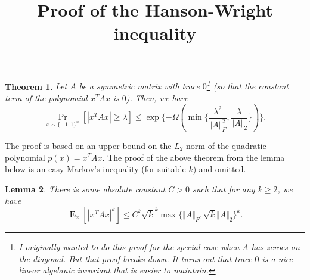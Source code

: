 \documentclass[11pt,a4paper]{article}
\title{Proof of the Hanson-Wright inequality}
\date{}
\newtheorem{theorem}{Theorem}
\newtheorem{lemma}[theorem]{Lemma}
\newcommand{\prob}[2]{\mathop{\mathrm{Pr}}_{#1}[#2]}
\newcommand{\avg}[2]{\mathop{\textbf{E}}_{#1}[#2]}
\newcommand{\mynorm}[1]{\Vert #1 \Vert}
\begin{document}
\maketitle

\begin{theorem}
\label{thm:HW}
Let $A$ be a symmetric matrix with trace $0$\footnote{I originally wanted to do this proof for the special case when $A$ has zeroes on the diagonal. But that proof breaks down. It turns out that trace $0$ is a nice linear algebraic invariant that is easier to maintain.} (so that the constant term of the polynomial $x^TAx$ is $0$). Then, we have
\[
\prob{x\sim \{-1,1\}^n}{|x^TAx| \geq \lambda} \leq \exp\{-\Omega(\min\{\frac{\lambda^2}{\mynorm{A}_F^2}, \frac{\lambda}{\mynorm{A}_2}\})\}.
\]
\end{theorem}

The proof is based on an upper bound on the $L_2$-norm of the quadratic polynomial $p(x) = x^TAx$. The proof of the above theorem from the lemma below is an easy Markov's inequality (for suitable $k$) and omitted.

\begin{lemma}
\label{lem:Lknorm}
There is some absolute constant $C> 0$ such that for any $k\geq 2$, we have 
\[
\avg{x}{|x^TAx|^k}\leq C^k \sqrt{k}^k \max\{\mynorm{A}_F, \sqrt{k}\mynorm{A}_2\}^k.
\]
\end{lemma}
\end{document}
